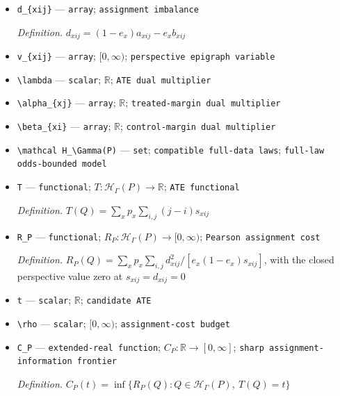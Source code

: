 \documentclass{article}
\begin{document}
\begin{itemize}
  \par\smallskip\noindent\emph{Definition.} \(s_{xij}=a_{xij}+b_{xij}\)
  \item \texttt{d\_\allowbreak{}\{xij\}\allowbreak{}} --- \texttt{array}; \texttt{assignment imbalance}
  \par\smallskip\noindent\emph{Definition.} \(d_{xij}=(1-e_x)a_{xij}-e_xb_{xij}\)
  \item \texttt{v\_\allowbreak{}\{xij\}\allowbreak{}} --- \texttt{array}; \([0,\infty)\); \texttt{perspective epigraph variable}
  \item \texttt{\textbackslash{}\allowbreak{}lambda} --- \texttt{scalar}; \(\mathbb R\); \texttt{ATE dual multiplier}
  \item \texttt{\textbackslash{}\allowbreak{}alpha\_\allowbreak{}\{xj\}\allowbreak{}} --- \texttt{array}; \(\mathbb R\); \texttt{treated-\allowbreak{}margin dual multiplier}
  \item \texttt{\textbackslash{}\allowbreak{}beta\_\allowbreak{}\{xi\}\allowbreak{}} --- \texttt{array}; \(\mathbb R\); \texttt{control-\allowbreak{}margin dual multiplier}
  \item \texttt{\textbackslash{}\allowbreak{}mathcal H\_\allowbreak{}\textbackslash{}\allowbreak{}Gamma(P)} --- \texttt{set}; \texttt{compatible full-\allowbreak{}data laws}; \texttt{full-\allowbreak{}law odds-\allowbreak{}bounded model}
  \item \texttt{T} --- \texttt{functional}; \(T:\mathcal H_\Gamma(P)\to\mathbb R\); \texttt{ATE functional}
  \par\smallskip\noindent\emph{Definition.} \(T(Q)=\sum_xp_x\sum_{i,j}(j-i)s_{xij}\)
  \item \texttt{R\_\allowbreak{}P} --- \texttt{functional}; \(R_P:\mathcal H_\Gamma(P)\to[0,\infty)\); \texttt{Pearson assignment cost}
  \par\smallskip\noindent\emph{Definition.} \(R_P(Q)=\sum_xp_x\sum_{i,j}d_{xij}^2/[e_x(1-e_x)s_{xij}]\), with the closed perspective value zero at \(s_{xij}=d_{xij}=0\)
  \item \texttt{t} --- \texttt{scalar}; \(\mathbb R\); \texttt{candidate ATE}
  \item \texttt{\textbackslash{}\allowbreak{}rho} --- \texttt{scalar}; \([0,\infty)\); \texttt{assignment-\allowbreak{}cost budget}
  \item \texttt{C\_\allowbreak{}P} --- \texttt{extended-\allowbreak{}real function}; \(C_P:\mathbb R\to[0,\infty]\); \texttt{sharp assignment-\allowbreak{}information frontier}
  \par\smallskip\noindent\emph{Definition.} \(C_P(t)=\inf\{R_P(Q):Q\in\mathcal H_\Gamma(P),\ T(Q)=t\}\)

\end{itemize}
\end{document}
